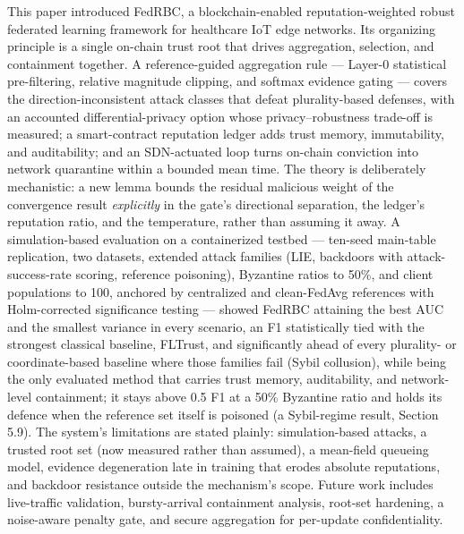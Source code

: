 \documentclass[cmc,article,submit,moreauthors,pdftex]{Definitions/tsp}
\begin{document}
This paper introduced FedRBC, a blockchain-enabled reputation-weighted robust federated learning framework for healthcare IoT edge networks. Its organizing principle is a single on-chain trust root that drives aggregation, selection, and containment together. A reference-guided aggregation rule --- Layer-0 statistical pre-filtering, relative magnitude clipping, and softmax evidence gating --- covers the direction-inconsistent attack classes that defeat plurality-based defenses, with an accounted differential-privacy option whose privacy--robustness trade-off is measured; a smart-contract reputation ledger adds trust memory, immutability, and auditability; and an SDN-actuated loop turns on-chain conviction into network quarantine within a bounded mean time. The theory is deliberately mechanistic: a new lemma bounds the residual malicious weight of the convergence result \emph{explicitly} in the gate's directional separation, the ledger's reputation ratio, and the temperature, rather than assuming it away. A simulation-based evaluation on a containerized testbed --- ten-seed main-table replication, two datasets, extended attack families (LIE, backdoors with attack-success-rate scoring, reference poisoning), Byzantine ratios to 50\%, and client populations to 100, anchored by centralized and clean-FedAvg references with Holm-corrected significance testing --- showed FedRBC attaining the best AUC and the smallest variance in every scenario, an F1 statistically tied with the strongest classical baseline, FLTrust, and significantly ahead of every plurality- or coordinate-based baseline where those families fail (Sybil collusion), while being the only evaluated method that carries trust memory, auditability, and network-level containment; it stays above 0.5 F1 at a 50\% Byzantine ratio and holds its defence when the reference set itself is poisoned (a Sybil-regime result, Section 5.9). The system's limitations are stated plainly: simulation-based attacks, a trusted root set (now measured rather than assumed), a mean-field queueing model, evidence degeneration late in training that erodes absolute reputations, and backdoor resistance outside the mechanism's scope. Future work includes live-traffic validation, bursty-arrival containment analysis, root-set hardening, a noise-aware penalty gate, and secure aggregation for per-update confidentiality.



\end{document}
